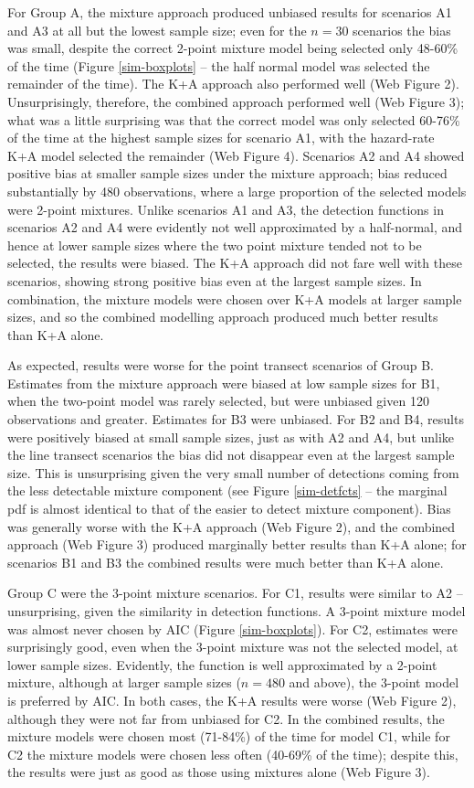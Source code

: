 \documentclass[authoryear,preprint,review,12pt]{elsarticle}
\begin{document}
For Group A, the mixture approach produced unbiased results for scenarios A1 and A3 at all but the lowest sample size; even for the $n=30$ scenarios the bias was small, despite the correct 2-point mixture model being selected only 48-60\% of the time (Figure \ref{sim-boxplots} -- the half normal model was selected the remainder of the time).  The K+A approach also performed well (Web Figure 2). Unsurprisingly, therefore, the combined approach performed well (Web Figure 3); what was a little surprising was that the correct model was only selected 60-76\% of the time at the highest sample sizes for scenario A1, with the hazard-rate K+A model selected the remainder (Web Figure 4). Scenarios A2 and A4 showed positive bias at smaller sample sizes under the mixture approach; bias reduced substantially by 480 observations, where a large proportion of the selected models were 2-point mixtures. Unlike scenarios A1 and A3, the detection functions in scenarios A2 and A4 were evidently not well approximated by a half-normal, and hence at lower sample sizes where the two point mixture tended not to be selected, the results were biased. The K+A approach did not fare well with these scenarios, showing strong positive bias even at the largest sample sizes. In combination, the mixture models were chosen over K+A models at larger sample sizes, and so the combined modelling approach produced much better results than K+A alone.  

As expected, results were worse for the point transect scenarios of Group B.  Estimates from the mixture approach were biased at low sample sizes for B1, when the two-point model was rarely selected, but were unbiased given 120 observations and greater.  Estimates for B3 were unbiased.  For B2 and B4, results were positively biased at small sample sizes, just as with A2 and A4, but unlike the line transect scenarios the bias did not disappear even at the largest sample size.  This is unsurprising given the very small number of detections coming from the less detectable mixture component (see Figure \ref{sim-detfcts} -- the marginal pdf is almost identical to that of the easier to detect mixture component). Bias was generally worse with the K+A approach (Web Figure 2), and the combined approach (Web Figure 3) produced marginally better results than K+A alone; for scenarios B1 and B3 the combined results were much better than K+A alone. 

Group C were the 3-point mixture scenarios.  For C1, results were similar to A2 -- unsurprising, given the similarity in detection functions.  A 3-point mixture model was almost never chosen by AIC (Figure \ref{sim-boxplots}).  For C2, estimates were surprisingly good, even when the 3-point mixture was not the selected model, at lower sample sizes.  Evidently, the function is well approximated by a 2-point mixture, although at larger sample sizes ($n=480$ and above), the 3-point model is preferred by AIC. In both cases, the K+A results were worse (Web Figure 2), although they were not far from unbiased for C2.  In the combined results, the mixture models were chosen most (71-84\%) of the time for model C1, while for C2 the mixture models were chosen less often (40-69\% of the time); despite this, the results were just as good as those using mixtures alone (Web Figure 3).
\end{document}

